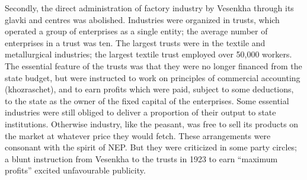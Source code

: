 Secondly, the direct administration of factory industry by Vesenkha through its glavki and centres was abolished. Industries were organized in trusts, which operated a group of enterprises as a single entity; the average number of enterprises in a trust was ten. The largest trusts were in the textile and metallurgical industries; the largest textile trust employed over 50,000 workers. The essential feature of the trusts was that they were no longer financed from the state budget, but were instructed to work on principles of commercial accounting (khozraschet), and to earn profits which were paid, subject to some deductions, to the state as the owner of the fixed capital of the enterprises. Some essential industries were still obliged to deliver a proportion of their output to state institutions. Otherwise industry, like the peasant, was free to sell its products on the market at whatever price they would fetch. These arrangements were consonant with the spirit of NEP. But they were criticized in some party circles; a blunt instruction from Vesenkha to the trusts in 1923 to earn ``maximum profits'' excited unfavourable publicity. 

